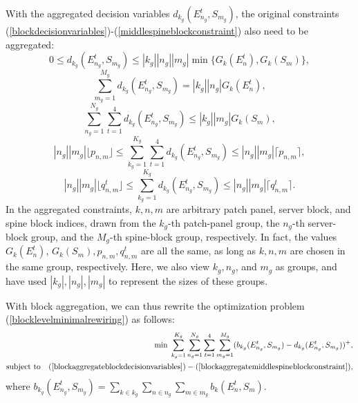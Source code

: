 \documentclass[letterpaper,twocolumn,10pt]{article}
\begin{document}
With the aggregated decision variables $d_{k_g}(E_{n_g}^t, S_{m_g})$, the original constraints (\ref{blockdecisionvariables})-(\ref{middlespineblockconstraint}) also need to be aggregated:
\begin{equation}\label{blockaggregateblockdecisionvariables}
0\leq d_{k_g}(E_{n_g}^t, S_{m_g})\leq |k_g||n_g||m_g|\min\{G_k(E_n^t), G_k(S_m)\},
\end{equation}
\begin{equation}\label{blockaggregatesuperblockconnect}
\sum_{m_g=1}^{M_g}d_{k_g}(E_{n_g}^t, S_{m_g}) = |k_g||n_g|G_k(E_n^t),
\end{equation}
\begin{equation}\label{blockaggregatespineblockconnect}
\sum_{n_g=1}^{N_g}\sum_{t=1}^4d_{k_g}(E_{n_g}^t, S_{m_g}) \leq |k_g||m_g|G_k(S_m),
\end{equation}
\begin{equation}\label{blockaggregatesuperspineblockconstraint}
|n_g||m_g|\lfloor p_{n,m}\rfloor\leq \sum_{k_g=1}^{K_g}\sum_{t=1}^4 d_{k_g}(E_{n_g}^t, S_{m_g})\leq |n_g||m_g|\lceil p_{n,m}\rceil,
\end{equation}
\begin{equation}\label{blockaggregatemiddlespineblockconstraint}
|n_g||m_g|\lfloor q^t_{n,m}\rfloor\leq \sum_{k_g=1}^{K_g}d_{k_g}(E_{n_g}^t, S_{m_g})\leq |n_g||m_g|\lceil q^t_{n,m}\rceil.
\end{equation}
In the aggregated  constraints, $k, n, m$ are arbitrary patch panel, server block, and spine block indices, drawn from the $k_g$-th patch-panel group, the $n_g$-th server-block group, and the $M_g$-th spine-block group, respectively. In fact, the values $G_k(E_n^t)$, $G_k(S_m), p_{n,m}, q^t_{n,m}$ are all the same, as long as $k, n, m$ are chosen in the same group, respectively. Here, we also view $k_g, n_g$, and $m_g$ as groups, and have used $|k_g|, |n_g|, |m_g|$ to represent the sizes of these groups.

With block aggregation, we can thus rewrite the optimization problem (\ref{blocklevelminimalrewiring}) as follows:
\begin{eqnarray}\label{minimalrewiringwithblockaggregation}
&&\hspace{-18mm}\min\hspace{1mm}\sum_{k_g=1}^{K_g}\sum_{n_g=1}^{N_g}\sum_{t=1}^4\sum_{m_g=1}^{M_g}(b_{k_g}(E_{n_g}^t, S_{m_g}) - d_{k_g}(E_{n_g}^t, S_{m_g}))^+, \nonumber\\
&\text{subject to}&(\ref{blockaggregateblockdecisionvariables})-(\ref{blockaggregatemiddlespineblockconstraint}),
\end{eqnarray}
where $b_{k_g}(E_{n_g}^t, S_{m_g})=\sum_{k\in k_g}\sum_{n\in n_g}\sum_{m\in m_g}b_k(E_n^t, S_m)$.
\end{document}
